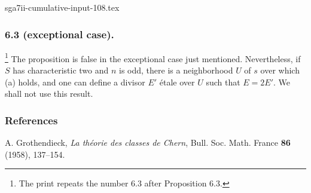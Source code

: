 \begin{filecontents*}{sga7ii-cumulative-input-108.tex}
\subsubsection*{6.3 (exceptional case).}
\footnote{The print repeats the number 6.3 after Proposition 6.3.}
The proposition is false in the exceptional case just mentioned.
Nevertheless, if $S$ has characteristic two and $n$ is odd, there is
a neighborhood $U$ of $s$ over which (a) holds, and one can define a
divisor $E'$ étale over $U$ such that $E=2E'$.  We shall not use this
result.

\subsubsection*{References}

\noindent[1] A. Grothendieck, \emph{La théorie des classes de Chern},
Bull. Soc. Math. France \textbf{86} (1958), 137--154.

\end{filecontents*}
